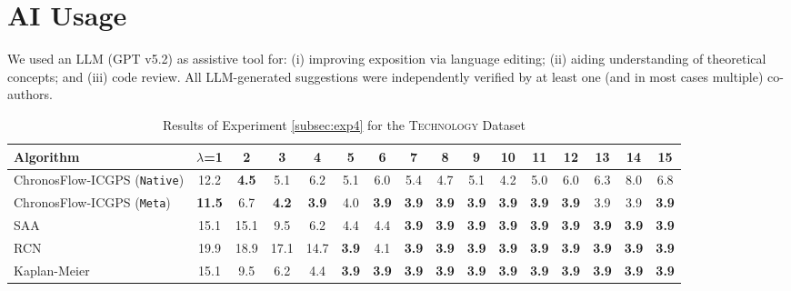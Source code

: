 \documentclass[11pt]{article}
\renewcommand{\arraystretch}{1.15}
\renewcommand{\arraystretch}{0.88}
\begin{document}
\section*{AI Usage}
We used an LLM (GPT v5.2) as assistive tool for: (i) improving exposition via language editing; (ii) aiding understanding of theoretical concepts; and (iii) code review. All LLM-generated suggestions were independently verified by at least one (and in most cases multiple) co-authors.





\begin{table}[t]
\centering
\caption{Results of Experiment \ref{subsec:exp4} for the \textsc{Technology} Dataset}
\footnotesize
\setlength{\tabcolsep}{3pt}
\renewcommand{\arraystretch}{1.05}
\begin{adjustbox}{max width=\textwidth,center}
\begin{tabular}{l*{15}{c}}
\toprule
Algorithm & $\lambda$=1 & 2 & 3 & 4 & 5 & 6 & 7 & 8 & 9 & 10 & 11 & 12 & 13 & 14 & 15 \\
\midrule
ChronosFlow-ICGPS (\texttt{Native}) & 12.2 & \textbf{4.5} & 5.1 & 6.2 & 5.1 & 6.0 & 5.4 & 4.7 & 5.1 & 4.2 & 5.0 & 6.0 & 6.3 & 8.0 & 6.8 \\
ChronosFlow-ICGPS (\texttt{Meta}) & \textbf{11.5} & 6.7 & \textbf{4.2} & \textbf{3.9} & 4.0 & \textbf{3.9} & \textbf{3.9} & \textbf{3.9} & \textbf{3.9} & \textbf{3.9} & \textbf{3.9} & \textbf{3.9} & 3.9 & 3.9 & \textbf{3.9} \\
SAA & 15.1 & 15.1 & 9.5 & 6.2 & 4.4 & 4.4 & \textbf{3.9} & \textbf{3.9} & \textbf{3.9} & \textbf{3.9} & \textbf{3.9} & \textbf{3.9} & \textbf{3.9} & \textbf{3.9} & \textbf{3.9} \\
RCN \citep{hssaine2024censored} & 19.9 & 18.9 & 17.1 & 14.7 & \textbf{3.9} & 4.1 & \textbf{3.9} & \textbf{3.9} & \textbf{3.9} & \textbf{3.9} & \textbf{3.9} & \textbf{3.9} & \textbf{3.9} & \textbf{3.9} & \textbf{3.9} \\
Kaplan-Meier & 15.1 & 9.5 & 6.2 & 4.4 & \textbf{3.9} & \textbf{3.9} & \textbf{3.9} & \textbf{3.9} & \textbf{3.9} & \textbf{3.9} & \textbf{3.9} & \textbf{3.9} & \textbf{3.9} & \textbf{3.9} & \textbf{3.9} \\
\bottomrule
\end{tabular}
\end{adjustbox}
\label{tab:exp4-real_1}
\end{table}




{


}
\newpage
\appendix
{}
\renewcommand{\thetable}{\thesection.\arabic{table}}
\end{document}
